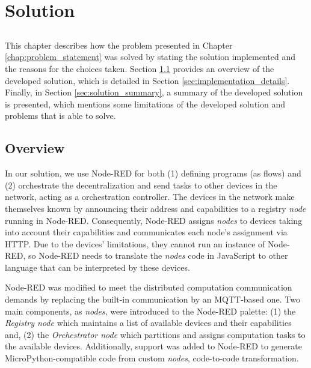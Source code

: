 \chapter{Solution} \label{chap:solution} \minitoc

\section*{}

This chapter describes how the problem presented in Chapter \ref{chap:problem_statement} was solved by stating the solution implemented and the reasons for the choices taken. Section \ref{sec:solution_overview} provides an overview of the developed solution, which is detailed in Section \ref{sec:implementation_details}. Finally, in Section \ref{sec:solution_summary}, a summary of the developed solution is presented, which mentions some limitations of the developed solution and problems that is able to solve.

\section{Overview}\label{sec:solution_overview}

In our solution, we use Node-RED for both (1) defining programs (as flows) and (2) orchestrate the decentralization and send tasks to other devices in the network, acting as a orchestration controller. The devices in the network make themselves known by announcing their address and capabilities to a registry \textit{node} running in Node-RED. Consequently, Node-RED assigns \textit{nodes} to devices taking into account their capabilities and communicates each node's assignment via HTTP. Due to the devices' limitations, they cannot run an instance of Node-RED, so Node-RED needs to translate the \textit{nodes} code in JavaScript to other language that can be interpreted by these devices. 

Node-RED was modified to meet the distributed computation communication demands by replacing the built-in communication by an MQTT-based one. Two main components, as \textit{nodes}, were introduced to the Node-RED palette: (1) the \textit{Registry node} which maintains a list of available devices and their capabilities and, (2) the \textit{Orchestrator node} which partitions and assigns computation tasks to the available devices. Additionally, support was added to Node-RED to generate MicroPython-compatible code from custom \textit{nodes}, \ie code-to-code transformation.

